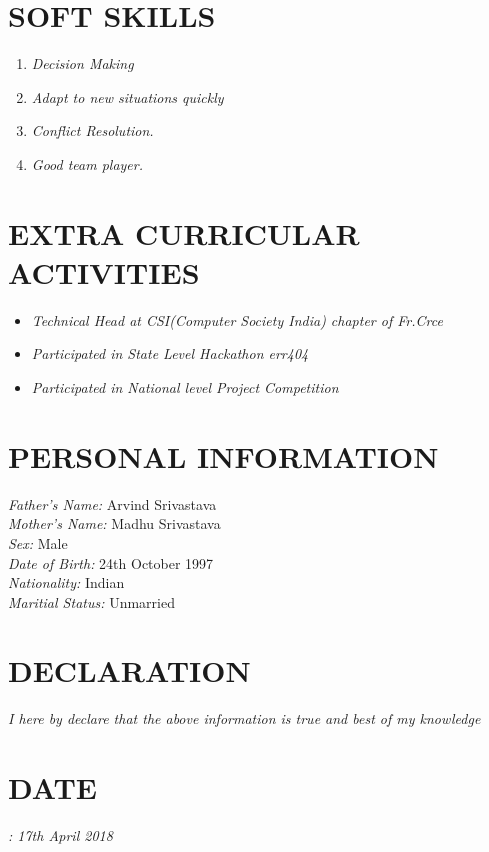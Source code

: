 \documentclass[margin]{res}
\begin{document}
\begin{resume}
\section{SOFT SKILLS }\begin{enumerate}
\item{\sl Decision Making}
\item{\sl Adapt to new situations quickly}
\item{\sl Conflict Resolution.}
\item{\sl Good team player.}
\end{enumerate}


\section{EXTRA CURRICULAR ACTIVITIES}\begin{itemize}
\item{\sl Technical Head at CSI(Computer Society India) chapter of Fr.Crce}
\item{\sl Participated in State Level Hackathon err404}
\item{\sl Participated in National level Project Competition}
\end{itemize}


\section{PERSONAL INFORMATION}
{\sl Father's Name:} Arvind Srivastava\\
{\sl Mother's Name:} Madhu Srivastava\\
{\sl Sex:} Male\\
{\sl Date of Birth:} 24th October 1997\\
{\sl Nationality:} Indian\\
{\sl Maritial Status:} Unmarried\\

\section{DECLARATION} 
{\sl I here by declare that the above information is true and best of my knowledge}

 \section{DATE}
 {\sl : 17th April 2018}
\end{resume}
\end{document}
